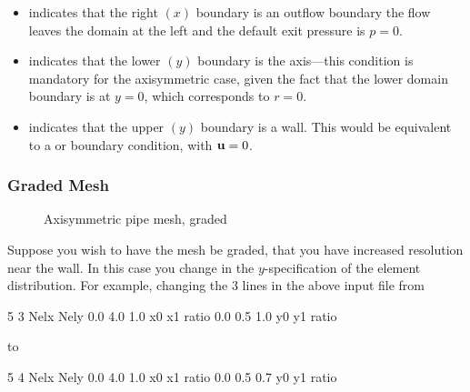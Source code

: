 \documentclass[letterpaper,10pt,english]{sphinxmanual}
\begin{document}
\begin{itemize}
\begin{itemize}
\item {} 
 indicates that the right \((x)\) boundary is an outflow boundary \textendash{} the
flow leaves the domain at the left and the default exit pressure is \(p=0\).

\item {} 
 indicates that the lower \((y)\) boundary is the axis—this condition
is mandatory for the axisymmetric case, given the fact that the lower domain
boundary is at \(y=0\), which corresponds to \(r=0\).

\item {} 
 indicates that the upper \((y)\) boundary is a wall.  This would be
equivalent to a  or  boundary condition, with \({\bf u}=0\).

\end{itemize}

\end{itemize}


\subsubsection{Graded Mesh}
\label{\detokenize{appendix:graded-mesh}}
\begin{figure}[htbp]
\centering
\capstart

\noindent{}
\caption{Axisymmetric pipe mesh, graded}\label{\detokenize{appendix:fig-mesh-axi2}}\label{\detokenize{appendix:id4}}\end{figure}

Suppose you wish to have the mesh be graded,
that you have increased resolution near the wall.
In this case you change  in the \(y\)-specification
of the element distribution.  For example, changing the 3 lines
in the above  input file from

%
\begin{sphinxVerbatim}[commandchars=\\\{\}]
\PYGZhy{}5 \PYGZhy{}3                         Nelx  Nely
0.0   4.0   1.0               x0  x1   ratio
0.0   0.5   1.0               y0  y1   ratio
\end{sphinxVerbatim}

to

%
\begin{sphinxVerbatim}[commandchars=\\\{\}]
\PYGZhy{}5 \PYGZhy{}4                         Nelx  Nely
0.0   4.0   1.0               x0  x1   ratio
0.0   0.5   0.7               y0  y1   ratio
\end{sphinxVerbatim}
\end{document}
